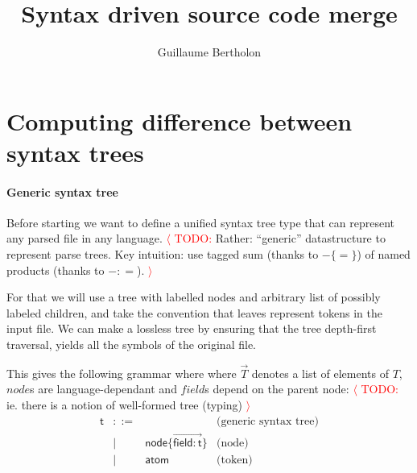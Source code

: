 \documentclass[a4paper,11pt]{article}
\title{Syntax driven source code merge}
\author{Guillaume Bertholon}
\renewcommand\vec[1]{\overrightarrow{#1}}
\begin{document}
\maketitle

\newcommand{\TODO}[1]{\textcolor{red}{$\langle$ TODO:} #1 \textcolor{red}{$\rangle$}}


\newcommand{\aNode}{\ensuremath{\mathsf{node}}}
\newcommand{\aField}{\ensuremath{\mathsf{field}}}
\newcommand{\aAtom}{\ensuremath{\mathsf{atom}}}
\newcommand{\aTree}{\ensuremath{\mathsf{t}}}
\newcommand{\many}[1]{\ensuremath{\overrightarrow{#1}}}

\newcommand{\defNode}[2]{\ensuremath{#1 \{ #2 \}}}
\newcommand{\defField}[2]{\ensuremath{#1 : #2}}



\section{Computing difference between syntax trees}

\paragraph{Generic syntax tree}
Before starting we want to define a unified syntax tree type that can
represent any parsed file in any language. \TODO{Rather: ``generic''
  datastructure to represent parse trees. Key intuition: use tagged
  sum (thanks to \defNode{-}{=}) of named products (thanks to
  \defField{-}{=}).}

For that we will use a tree with labelled
nodes and arbitrary list of possibly labeled children, and take the convention
that leaves represent tokens in the input file. We can make a lossless tree by
ensuring that the tree depth-first traversal, yields all the symbols of the
original file.

This gives the following grammar where where $\vec{T}$ denotes a list of
elements of $T$, $node$s are language-dependant and $field$s depend on the
parent node: \TODO{ie. there is a notion of well-formed tree (typing)}
%
\[\begin{array}{lcll}
\aTree & ::= & & \text{(generic syntax tree)} \\
       &  |  & \defNode{\aNode}{\many{\defField{\aField}{\aTree}}} & \text{(node)} \\
       &  |  & \aAtom & \text{(token)}
\end{array}\]
\end{document}
